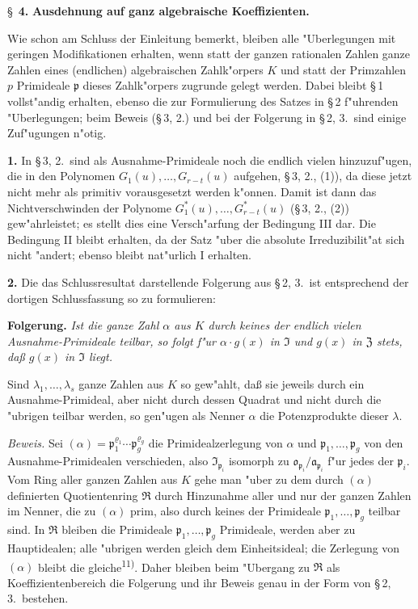 \bigskip
\S~\textbf{4.}
\textbf{Ausdehnung auf ganz algebraische Koeffizienten.}

\smallskip

\noindent
Wie schon am Schluss der Einleitung bemerkt, bleiben alle "Uberlegungen mit geringen Modifikationen erhalten, wenn statt der ganzen rationalen Zahlen ganze Zahlen eines (endlichen) algebraischen Zahlk"orpers $K$ und statt der Primzahlen $p$ Primideale $\mathfrak{p}$ dieses Zahlk"orpers zugrunde gelegt werden. Dabei bleibt \S\,1 vollst"andig erhalten, ebenso die zur Formulierung des Satzes in \S\,2 f"uhrenden "Uberlegungen; beim Beweis (\S\,3, 2.) und bei der Folgerung in \S\,2, 3.\ sind einige Zuf"ugungen n"otig.

\medskip\noindent\textbf{1.}
In \S\,3, 2.\ sind als Ausnahme-Primideale noch die endlich vielen hinzuzuf"ugen, die in den Polynomen $G_1(u),\ldots,G_{r-t}(u)$ aufgehen, \S\,3, 2., (1)), da diese jetzt nicht mehr als primitiv vorausgesetzt werden k"onnen. Damit ist dann das Nichtverschwinden der Polynome $G^*_1(u),\ldots,G^*_{r-t}(u)$ (\S\,3, 2., (2)) gew"ahrleistet; es stellt dies eine Versch"arfung der Bedingung III dar. Die Bedingung II bleibt erhalten, da der Satz "uber die absolute Irreduzibilit"at sich nicht "andert; ebenso bleibt nat"urlich I erhalten.

\medskip\noindent\textbf{2.}
Die das Schlussresultat darstellende Folgerung aus \S\,2, 3.\ ist entsprechend der dortigen Schlussfassung so zu formulieren:

\noindent\textbf{Folgerung.}
\textit{Ist die ganze Zahl $\alpha$ aus $K$ durch keines der endlich vielen Ausnahme-Primideale teilbar, so folgt f"ur $\alpha \cdot g(x)$ in $\mathfrak{I}$ und $g(x)$ in $\mathfrak{Z}$ stets, da\ss{} $g(x)$ in $\mathfrak{I}$ liegt.}

Sind $\lambda_1,\ldots,\lambda_s$ ganze Zahlen aus $K$ so gew"ahlt, da\ss{} sie jeweils durch ein Ausnahme-Primideal, aber nicht durch dessen Quadrat und nicht durch die "ubrigen teilbar werden, so gen"ugen als Nenner $\alpha$ die Potenzprodukte dieser $\lambda$.

\noindent\textit{Beweis.}
Sei $(\alpha) = \mathfrak{p}_1^{\varrho_1} \cdots \mathfrak{p}_g^{\varrho_g}$ die Primidealzerlegung von $\alpha$ und $\mathfrak{p}_1,\ldots,\mathfrak{p}_g$ von den Ausnahme-Primidealen verschieden, also $\mathfrak{I}_{\mathfrak{p}_i}$ isomorph zu $\mathfrak{o}_{\mathfrak{p}_i}/\mathfrak{a}_{\mathfrak{p}_i}$ f"ur jedes der $\mathfrak{p}_i$. Vom Ring aller ganzen Zahlen aus $K$ gehe man "uber zu dem durch $(\alpha)$ definierten Quotientenring $\mathfrak{R}$ durch Hinzunahme aller und nur der ganzen Zahlen im Nenner, die zu $(\alpha)$ prim, also durch keines der Primideale $\mathfrak{p}_1,\ldots,\mathfrak{p}_g$ teilbar sind. In $\mathfrak{R}$ bleiben die Primideale $\mathfrak{p}_1,\ldots,\mathfrak{p}_g$ Primideale, werden aber zu Hauptidealen; alle "ubrigen werden gleich dem Einheitsideal; die Zerlegung von $(\alpha)$ bleibt die gleiche\textsuperscript{11)}. Daher bleiben beim "Ubergang zu $\mathfrak{R}$ als Koeffizientenbereich die Folgerung und ihr Beweis genau in der Form von \S\,2, 3.\ bestehen.

